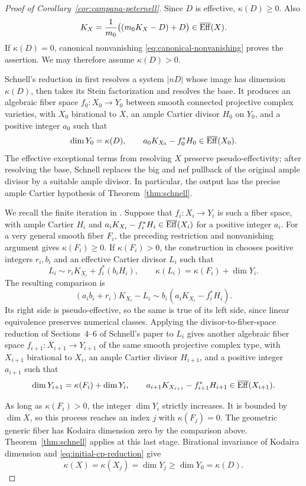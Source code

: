 \begin{proof}[Proof of Corollary~\ref{cor:campana-peternell}]
Since $D$ is effective, $\kappa(D)\geq0$. Also
\[
 K_X=\frac1{m_0}\bigl((m_0K_X-D)+D\bigr)\in\overline{\operatorname{Eff}}(X).
\]
If $\kappa(D)=0$, canonical nonvanishing
\eqref{eq:canonical-nonvanishing} proves the assertion. We may
therefore assume $\kappa(D)>0$.

Schnell's reduction in \cite[Sections~4--6]{Schnell2022} first
resolves a system $|nD|$ whose image has dimension $\kappa(D)$,
then takes its Stein factorization and resolves the base. It produces
an algebraic fiber space
$f_0\colon X_0\to Y_0$ between smooth connected projective complex
varieties, with $X_0$ birational to $X$, an ample Cartier divisor
$H_0$ on $Y_0$, and a positive integer $a_0$ such that
\begin{equation}\label{eq:initial-cp-reduction}
 \dim Y_0=\kappa(D),\qquad
 a_0K_{X_0}-f_0^*H_0\in\overline{\operatorname{Eff}}(X_0).
\end{equation}
The effective exceptional terms from resolving $X$ preserve
pseudo-effectivity; after resolving the base, Schnell replaces the
big and nef pullback of the original ample divisor by a suitable
ample divisor. In particular, the output has the precise ample
Cartier hypothesis of Theorem~\ref{thm:schnell}.

We recall the finite iteration in
\cite[Sections~7 and~9]{Schnell2022}. Suppose that
$f_i\colon X_i\to Y_i$ is such a fiber space, with ample Cartier
$H_i$ and
$a_iK_{X_i}-f_i^*H_i\in\overline{\operatorname{Eff}}(X_i)$ for a positive integer $a_i$.
For a very general smooth fiber $F_i$, the preceding restriction and
nonvanishing argument gives $\kappa(F_i)\geq0$. If
$\kappa(F_i)>0$, the construction in
\cite[Lemma~7.1]{Schnell2022} chooses positive integers $r_i,b_i$
and an effective Cartier divisor $L_i$ such that
\[
 L_i\sim r_iK_{X_i}+f_i^*(b_iH_i),\qquad
 \kappa(L_i)=\kappa(F_i)+\dim Y_i.
\]
The resulting comparison is
\[
 (a_ib_i+r_i)K_{X_i}-L_i
 \sim b_i(a_iK_{X_i}-f_i^*H_i).
\]
Its right side is pseudo-effective, so the same is true of its left
side, since linear equivalence preserves numerical classes.
Applying the divisor-to-fiber-space reduction of Sections~4--6 of
Schnell's paper to $L_i$ gives another algebraic fiber space
$f_{i+1}\colon X_{i+1}\to Y_{i+1}$ of the same smooth projective
complex type, with $X_{i+1}$ birational to $X_i$, an ample Cartier
divisor $H_{i+1}$, and a positive integer $a_{i+1}$ such that
\[
 \dim Y_{i+1}=\kappa(F_i)+\dim Y_i,\qquad
 a_{i+1}K_{X_{i+1}}-f_{i+1}^*H_{i+1}\in\overline{\operatorname{Eff}}(X_{i+1}).
\]

As long as $\kappa(F_i)>0$, the integer $\dim Y_i$ strictly
increases. It is bounded by $\dim X$, so this process reaches an
index $j$ with $\kappa(F_j)=0$. The geometric generic fiber has
Kodaira dimension zero by the comparison above.
Theorem~\ref{thm:schnell} applies at this last stage. Birational
invariance of Kodaira dimension and
\eqref{eq:initial-cp-reduction} give
\[
 \kappa(X)=\kappa(X_j)=\dim Y_j
 \geq\dim Y_0=\kappa(D).
\]
\end{proof}

